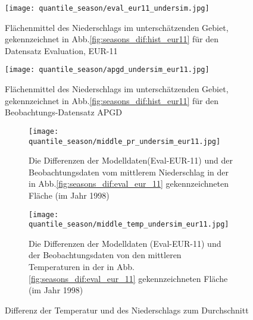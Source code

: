 \begin{figure}
	\texttt{[image: quantile\_season/eval\_eur11\_undersim.jpg]}
	\caption{Flächenmittel des Niederschlags im unterschätzenden Gebiet, gekennzeichnet in Abb.\ref{fig:seasons_dif:hist_eur11} für den Datensatz Evaluation, EUR-11}
	\label{fig:season:under_eval_eur11}
\end{figure}
\begin{figure}
	\texttt{[image: quantile\_season/apgd\_undersim\_eur11.jpg]}
	\caption{Flächenmittel des Niederschlags im unterschätzenden Gebiet, gekennzeichnet in Abb.\ref{fig:seasons_dif:hist_eur11} für den Beobachtungs-Datensatz APGD}
	\label{fig:season:under_apgd_eur11}
\end{figure}
\begin{figure}
	\begin{subfigure}{0.49\textwidth}
		\texttt{[image: quantile\_season/middle\_pr\_undersim\_eur11.jpg]}
		\caption{Die Differenzen der Modelldaten(Eval-EUR-11) und der Beobachtungsdaten vom mittlerem Niederschlag in der in Abb.\ref{fig:seasons_dif:eval_eur_11} gekennzeichneten Fläche (im Jahr 1998)}
	\end{subfigure}
	\begin{subfigure}{0.49\textwidth}
		\texttt{[image: quantile\_season/middle\_temp\_undersim\_eur11.jpg]}
		\caption{Die Differenzen der Modelldaten (Eval-EUR-11) und der Beobachtungsdaten von den mittleren Temperaturen in der in Abb.\ref{fig:seasons_dif:eval_eur_11} gekennzeichneten Fläche (im Jahr 1998)}
	\end{subfigure}
	\caption{Differenz der Temperatur und des Niederschlags zum Durchschnitt}
	\label{fig:seasons:undersim_eval_eur11}
\end{figure}\newpage

